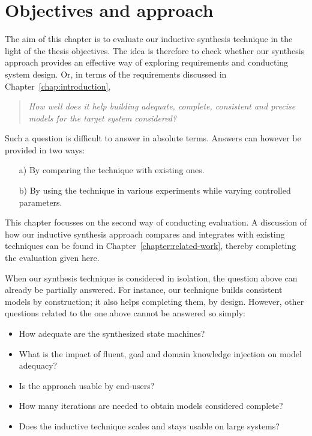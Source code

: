 \section{Objectives and approach\label{section:evaluation-objectives-and-approach}}

The aim of this chapter is to evaluate our inductive synthesis technique in the light of the thesis objectives. The idea is therefore to check whether our synthesis approach provides an effective way of exploring requirements and conducting system design. Or, in terms of the requirements discussed in Chapter~\ref{chap:introduction},

\begin{quotation}
\emph{How well does it help building \emph{adequate}, \emph{complete}, \emph{consistent} and \emph{precise} models for the target system considered?}
\end{quotation}

Such a question is difficult to answer in absolute terms. Answers can however be provided in two ways:
\begin{enumerate}
\item[a)] By comparing the technique with existing ones.
\item[b)] By using the technique in various experiments while varying controlled parameters.
\end{enumerate}
This chapter focusses on the second way of conducting evaluation. A discussion of how our inductive synthesis approach compares and integrates with existing techniques can be found in Chapter~\ref{chapter:related-work}, thereby completing the evaluation given here.

When our synthesis technique is considered in isolation, the question above can already be partially answered. For instance, our technique builds consistent models by construction; it also helps completing them, by design. However, other questions related to the one above cannot be answered so simply:
\begin{itemize}
\item How adequate are the synthesized state machines? 
\item What is the impact of fluent, goal and domain knowledge injection on model adequacy?
\item Is the approach usable by end-users? 
\item How many iterations are needed to obtain models considered complete?
\item Does the inductive technique scales and stays usable on large systems?
\end{itemize}

